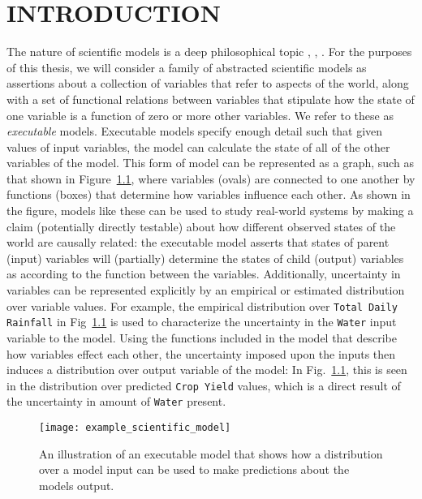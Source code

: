 \chapter{INTRODUCTION\label{chapter:introduction}}
The nature of scientific models is a deep philosophical topic \citep{giere2010explaining}, \citep{morrison2009models}, \citep{frigg2006models}.
For the purposes of this thesis, we will consider a family of abstracted scientific models as assertions about a collection of variables that refer to aspects of the world, along with a set of functional relations between variables that stipulate how the state of one variable is a function of zero or more other variables. We refer to these as {\em executable} models. Executable models specify enough detail such that given values of input variables, the model can calculate the state of all of the other variables of the model. 
This form of %
model can be represented as a graph, such as that shown in Figure~\ref{fig:example_sci_model}, where variables (ovals) are connected to one another by functions (boxes) that determine how variables influence each other.
As shown in the figure, %
models like these can be used to study real-world systems by making a claim (potentially directly testable) about how different observed states of the world are causally related: the executable model asserts that states of parent (input) variables will (partially) determine the states of child (output) variables as according to the function between the variables.
Additionally, uncertainty in variables %
can be represented explicitly by an empirical or estimated distribution over variable values. For example, the empirical distribution over {\tt Total Daily Rainfall} in Fig~\ref{fig:example_sci_model} is used to characterize the uncertainty in the {\tt Water} input variable to the model. 
Using the functions included in the model that describe how variables effect each other, the uncertainty imposed upon the inputs then induces a distribution over output variable of the model: In Fig.~\ref{fig:example_sci_model}, this is seen in the distribution over predicted {\tt Crop Yield} values, which is a direct result of the uncertainty in amount of {\tt Water} present.

\begin{figure}[!htbp]
  \centering
  \texttt{[image: example\_scientific\_model]}
  \caption[Example of a Scientific Model]{An illustration of an executable model that shows how a distribution over a model input can be used to make predictions about the models output.}
  \label{fig:example_sci_model}
\end{figure}

